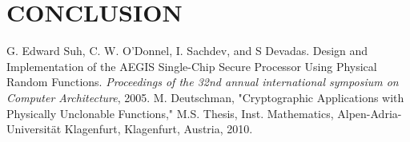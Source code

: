 \documentclass[letterpaper, 10 pt, conference]{ieeeconf}  %
\begin{document}
\section{CONCLUSION}

\addtolength{\textheight}{-12cm}   %

















\begin{thebibliography}{99}

 G. Edward Suh, C. W. O'Donnel, I. Sachdev, and S Devadas. Design and Implementation of the AEGIS Single-Chip Secure Processor Using Physical Random Functions. \emph{Proceedings of the 32nd annual international symposium on Computer Architecture}, 2005.
 M. Deutschman, "Cryptographic Applications with Physically Unclonable Functions," M.S. Thesis, Inst. Mathematics, Alpen-Adria-Universit\"{a}t Klagenfurt, Klagenfurt, Austria, 2010.
 
\end{thebibliography}
\end{document}
